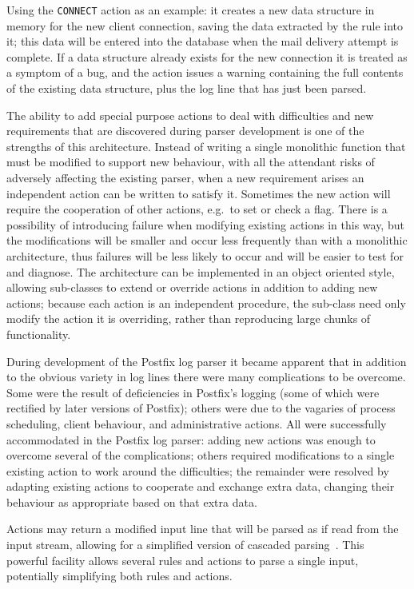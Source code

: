 \documentclass[preprint,draft,numbers,1p]{elsarticle}
\begin{document}
Using the \texttt{CONNECT} action as an example: it creates a new data
structure in memory for the new client connection, saving the data
extracted by the rule into it; this data will be entered into the database
when the mail delivery attempt is complete.  If a data structure already
exists for the new connection it is treated as a symptom of a bug, and the
action issues a warning containing the full contents of the existing data
structure, plus the log line that has just been parsed.

The ability to add special purpose actions to deal with difficulties and
new requirements that are discovered during parser development is one of
the strengths of this architecture.  Instead of writing a single monolithic
function that must be modified to support new behaviour, with all the
attendant risks of adversely affecting the existing parser, when a new
requirement arises an independent action can be written to satisfy it.
Sometimes the new action will require the cooperation of other actions,
e.g.\ to set or check a flag.  There is a possibility of introducing
failure when modifying existing actions in this way, but the modifications
will be smaller and occur less frequently than with a monolithic
architecture, thus failures will be less likely to occur and will be easier
to test for and diagnose.  The architecture can be implemented in an object
oriented style, allowing sub-classes to extend or override actions in
addition to adding new actions; because each action is an independent
procedure, the sub-class need only modify the action it is overriding,
rather than reproducing large chunks of functionality.

During development of the Postfix log parser it became apparent that in
addition to the obvious variety in log lines there were many complications
to be overcome.  Some were the result of deficiencies in Postfix's logging
(some of which were rectified by later versions of Postfix); others were
due to the vagaries of process scheduling, client behaviour, and
administrative actions.  All were successfully accommodated in the Postfix
log parser: adding new actions was enough to overcome several of the
complications; others required modifications to a single existing action to
work around the difficulties; the remainder were resolved by adapting
existing actions to cooperate and exchange extra data, changing their
behaviour as appropriate based on that extra data.

Actions may return a modified input line that will be parsed as if read
from the input stream, allowing for a simplified version of cascaded
parsing~\cite{cascaded-parsing}.  This powerful facility allows several
rules and actions to parse a single input, potentially simplifying both
rules and actions.
\end{document}

